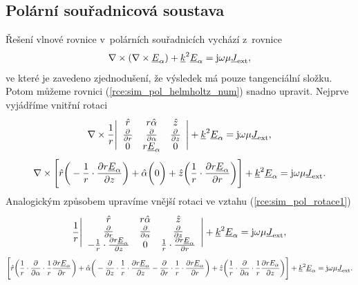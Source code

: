 \subsection{Polární souřadnicová soustava}
Řešení vlnové rovnice v~polárních souřadnicích vychází z~rovnice
\begin{equation}
	\nabla\times(\nabla\times{\underline{E}}_{\alpha}) +{\underline{k}}^{2}{\underline{E}}_{\alpha} = \mathrm{j}\omega\mu{\underline{J}}_{\mathrm{ext}},
	\label{rce:sim_pol_helmholtz_num} 
\end{equation}
ve které je zavedeno zjednodušení, že výsledek má pouze tangenciální složku. Potom můžeme rovnici (\ref{rce:sim_pol_helmholtz_num}) snadno upravit. Nejprve vyjádříme vnitřní rotaci
\begin{displaymath}
	\nabla\times \frac{1}{r}\Bigg|
	\begin{array}{ccc}
\hat{r} & r\hat{\alpha} & \hat{z} \\
\frac{\partial}{\partial r} & \frac{\partial}{\partial \alpha} & \frac{\partial}{\partial z} \\
0 & r{\underline{E}}_{\alpha} & 0\\
\end{array}\Bigg| +{\underline{k}}^{2}{\underline{E}}_{\alpha} = \mathrm{j}\omega\mu{\underline{J}}_{\mathrm{ext}},
\end{displaymath}
\begin{equation}
\nabla\times \Bigg[\hat{r}\bigg(-\frac{1}{r}\cdot\frac{\partial r{\underline{E}}_{\alpha}}{\partial z}\bigg) + \hat{\alpha}\bigg(0\bigg) + \hat{z}\bigg(\frac{1}{r}\cdot\frac{\partial r{\underline{E}}_{\alpha}}{\partial r}\bigg) \Bigg]+{\underline{k}}^{2}{\underline{E}}_{\alpha} = \mathrm{j}\omega\mu{\underline{J}}_{\mathrm{ext}}.
	\label{rce:sim_pol_rotace1}
\end{equation}
Analogickým způsobem upravíme vnější rotaci ve vztahu (\ref{rce:sim_pol_rotace1})
\begin{displaymath}
	\frac{1}{r}\Bigg|
	\begin{array}{ccc}
\hat{r} & r\hat{\alpha} & \hat{z} \\
\frac{\partial}{\partial r} & \frac{\partial}{\partial \alpha} & \frac{\partial}{\partial z} \\
-\frac{1}{r}\cdot\frac{\partial r{\underline{E}}_{\alpha}}{\partial z} & 0 & \frac{1}{r}\cdot\frac{\partial r{\underline{E}}_{\alpha}}{\partial r}\\
\end{array}\Bigg| +{\underline{k}}^{2}{\underline{E}}_{\alpha} = \mathrm{j}\omega\mu{\underline{J}}_{\mathrm{ext}},
\end{displaymath}
\begin{equation}
\Bigg[\hat{r}\bigg(\frac{1}{r}\cdot\frac{\partial}{\partial \alpha}\cdot\frac{1}{r}\frac{\partial r{\underline{E}}_{\alpha}}{\partial r}\bigg) + \hat{\alpha}\bigg(-\frac{\partial}{\partial z}\cdot\frac{1}{r}\cdot\frac{\partial r{\underline{E}}_{\alpha}}{\partial z} - \frac{\partial}{\partial r}\cdot\frac{1}{r}\cdot\frac{\partial r{\underline{E}}_{\alpha}}{\partial r}\bigg) + \hat{z}\bigg(\frac{1}{r}\cdot\frac{\partial}{\partial \alpha}\cdot\frac{1}{r}\frac{\partial r E_{\alpha}}{\partial z}\bigg) \Bigg]+{\underline{k}}^{2}{\underline{E}}_{\alpha} = \mathrm{j}\omega\mu{\underline{J}}_{\mathrm{ext}}.
	\label{rce:sim_pol_rotace2}
\end{equation}

